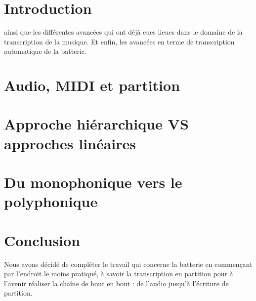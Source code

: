 \section{Introduction}
 ainsi que les différentes avancées qui ont déjà eues lieues dans le domaine de la transcription de la musique. Et enfin, les avancées en terme de transcription automatique de la batterie.
\section{Audio, MIDI et partition}
\section{Approche hiérarchique VS approches linéaires}
\section{Du monophonique vers le polyphonique} 
\section{Conclusion}
Nous avons décidé de compléter le travail qui concerne la batterie en commençant par l’endroit le moins pratiqué, à savoir la transcription en partition pour à l’avenir réaliser la chaîne de bout en bout : de l’audio jusqu’à l’écriture de partition.